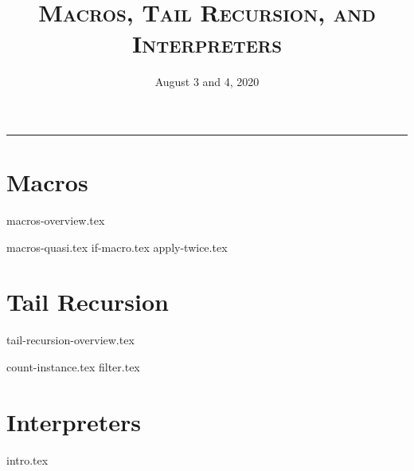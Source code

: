 \documentclass{exam}
\title{\textsc{Macros, Tail Recursion, and Interpreters}}
\date{August 3 and 4, 2020}
\begin{document}
\maketitle
\rule{\textwidth}{0.15em}
\fontsize{12}{15}\selectfont


\section{Macros}
{macros-overview.tex}
\begin{questions}
{macros-quasi.tex}
{if-macro.tex}
{apply-twice.tex}
\end{questions}

\newpage
\section{Tail Recursion}
{tail-recursion-overview.tex}
\begin{questions}
{count-instance.tex}
{filter.tex}
\end{questions}

\section{Interpreters}
\begin{questions}
{intro.tex}
\end{questions}

\end{document}

